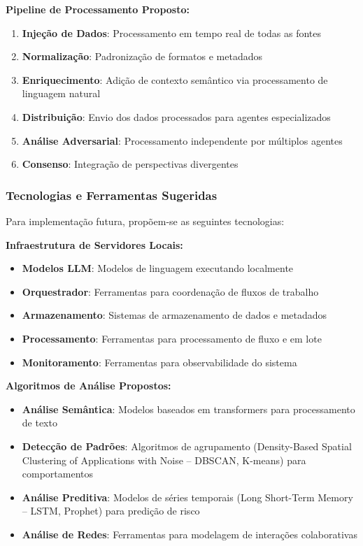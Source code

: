 \documentclass[english, spanish, brazilian]{modelo_dt}
\begin{document}
\textbf{Pipeline de Processamento Proposto:}
\begin{enumerate}
\item \textbf{Injeção de Dados}: Processamento em tempo real de todas as fontes
\item \textbf{Normalização}: Padronização de formatos e metadados
\item \textbf{Enriquecimento}: Adição de contexto semântico via processamento de linguagem natural
\item \textbf{Distribuição}: Envio dos dados processados para agentes especializados
\item \textbf{Análise Adversarial}: Processamento independente por múltiplos agentes
\item \textbf{Consenso}: Integração de perspectivas divergentes
\end{enumerate}

\subsubsection{Tecnologias e Ferramentas Sugeridas}

Para implementação futura, propõem-se as seguintes tecnologias:

\textbf{Infraestrutura de Servidores Locais:}
\begin{itemize}
\item \textbf{Modelos LLM}: Modelos de linguagem executando localmente
\item \textbf{Orquestrador}: Ferramentas para coordenação de fluxos de trabalho
\item \textbf{Armazenamento}: Sistemas de armazenamento de dados e metadados
\item \textbf{Processamento}: Ferramentas para processamento de fluxo e em lote
\item \textbf{Monitoramento}: Ferramentas para observabilidade do sistema
\end{itemize}

\textbf{Algoritmos de Análise Propostos:}
\begin{itemize}
\item \textbf{Análise Semântica}: Modelos baseados em transformers para processamento de texto
\item \textbf{Detecção de Padrões}: Algoritmos de agrupamento (Density-Based Spatial Clustering of Applications with Noise -- DBSCAN, K-means) para comportamentos
\item \textbf{Análise Preditiva}: Modelos de séries temporais (Long Short-Term Memory -- LSTM, Prophet) para predição de risco
\item \textbf{Análise de Redes}: Ferramentas para modelagem de interações colaborativas
\end{itemize}
\end{document}
